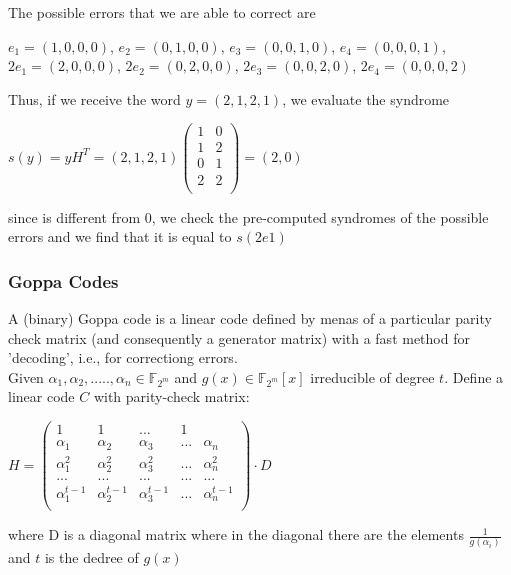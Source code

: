 \noindent
The possible errors that we are able to correct are
\begin{center}
    $e_1 = (1, 0, 0, 0)$, $e_2 = (0, 1, 0, 0)$, $e_3 = (0, 0, 1, 0)$, $e_4 = (0, 0, 0, 1)$, $2e_1 = (2, 0, 0, 0)$, $2e_2 = ( 0, 2, 0, 0)$, $2e_3 = (0, 0, 2, 0)$, $2e_4 = (0, 0, 0, 2)$
\end{center}
\noindent
Thus, if we receive the word $y = (2, 1, 2, 1)$, we evaluate the syndrome 
\begin{center}
    $s(y) = yH^T = (2, 1, 2, 1) \begin{pmatrix}
        1 & 0 \\
        1 & 2 \\
        0 & 1 \\
        2 & 2 \\
    \end{pmatrix} = (2, 0)$
\end{center}
\noindent
since is different from 0, we check the pre-computed syndromes of the possible errors and we find that it is equal to $s(2e1)$

\subsubsection{Goppa Codes}
A (binary) Goppa code is a linear code defined by menas of a particular parity check matrix (and consequently a generator matrix) with a fast method for 'decoding', i.e., for correctiong errors.\\
Given $\alpha_1, \alpha_2, ....., \alpha_n \in \mathbb{F}_{2^m}$ and $g(x) \in \mathbb{F}_{2^m} [x]$ irreducible of degree $t$. Define a linear code $C$ with parity-check matrix:
\begin{center}
    $H = \begin{pmatrix}
        1 & 1 & ... & 1 \\
        \alpha_1 & \alpha_2 & \alpha_3 & ... & \alpha_n \\
        \alpha_1^2 & \alpha_2^2 & \alpha_3^2 & ... & \alpha_n^2\\
        ... & ... & ... & ... & ... \\
        \alpha_1^{t-1} & \alpha_2^{t-1} & \alpha_3^{t-1} & ... & \alpha_n^{t-1} \\
        \end{pmatrix} \cdot D $
\end{center}
\noindent
where D is a diagonal matrix where in the diagonal there are the elements $\frac{1}{g(\alpha_i)}$ and $t$ is the dedree of $g(x)$
\bigskip

